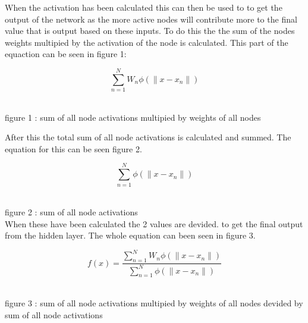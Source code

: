 \documentclass{IEEEtran}
\begin{document}
\begin{flushleft}
  When the activation has been calculated this can then be used to to get the output of the network
  as the more active nodes will contribute more to the final value that is output based on these inputs.
  To do this the the sum of the nodes weights multipied by the activation of the node is calculated.
  This part of the equaction can be seen in figure 1:
  \vspace{3mm}

  $$\sum_{n=1}^{N}W _n\phi(\|x-x_n\|) $$
  \\
  \vspace{1.5mm}

  {\footnotesize figure 1 : sum of all node activations multipied by weights of all nodes}

  \vspace{3mm}
  After this the total sum of all node activations is calculated and summed. The equation for this
  can be seen figure 2.

  \vspace{3mm}

  $$\sum_{n=1}^{N}\phi(\|x-x_n\|) $$
  \\
  \vspace{1.5mm}

  {\footnotesize figure 2 : sum of all node activations}
  \\
  \vspace{3mm}
  When these have been calculated the 2 values are devided. to get the final output from the
  hidden layer. The whole equation can been seen in figure 3.

  \vspace{3mm}

  $$f(x)=\frac{\sum_{n=1}^{N}W _n\phi(\|x-x_n\|)}{\sum_{n=1}^{N}\phi(\|x-x_n\|)}$$
  \\
  \vspace{1.5mm}

  {\footnotesize figure 3 : sum of all node activations multipied by weights of all nodes
  devided by sum of all node activations}
  \\
  \vspace{3mm}

\end{flushleft}
\end{document}
